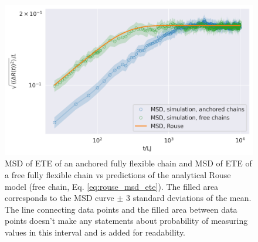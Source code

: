 \documentclass[
    paper=A4,pagesize=automedia,fontsize=12pt,
    BCOR=15mm,DIV=22,
    twoside,headinclude,footinclude=false,
    fleqn,             %
    bibliography=totocnumbered,          %
    listof=totoc,                %
    listof=flat,                 %
    cleardoublepage=empty      %
    numbers=endperiod
]{scrartcl}
\begin{document}
\begin{figure}[h]
    \begin{center}
      \includegraphics[width=\columnwidth,trim={0cm 0cm 0cm 0.9cm},clip]{3-exp-fixed-param-log.png}
      \caption{\label{fig:anchored_flex_chain_vs_rouse}
      MSD of ETE of an anchored fully flexible chain and
      MSD of ETE of a free fully flexible chain vs predictions of
      the analytical Rouse model (free chain, Eq. \ref{eq:rouse_msd_ete}).
      The filled area corresponds to the MSD curve $\pm$ 3 standard deviations of the mean. 
      The
      line connecting data points and the filled area between data points doesn't make
      any statements about probability of measuring values in this interval and is
      added for readability.
      }
    \end{center}
\end{figure}
\end{document}
